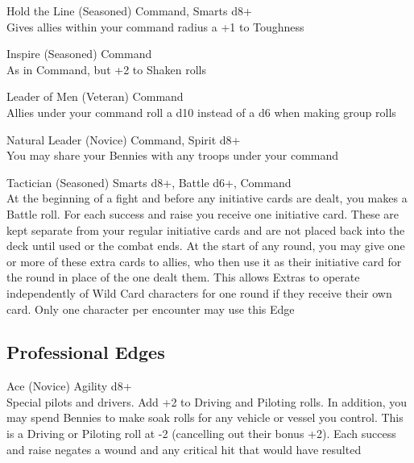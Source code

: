 \begin{multicols}{2}
\begin{genericsection}{Hold the Line (Seasoned)}
Command, Smarts d8+\\
Gives allies within your command radius a +1 to Toughness
\end{genericsection}

\begin{genericsection}{Inspire (Seasoned)}
Command\\
As in Command, but +2 to Shaken rolls
\end{genericsection}

\begin{genericsection}{Leader of Men (Veteran)}
Command\\
Allies under your command roll a d10 instead of a d6 when making group rolls
\end{genericsection}

\begin{genericsection}{Natural Leader (Novice)}
Command, Spirit d8+\\
You may share your Bennies with any troops under your command
\end{genericsection}

\begin{genericsection}{Tactician (Seasoned)}
Smarts d8+, Battle d6+, Command\\
At the beginning of a fight and before any initiative cards are dealt, you makes a Battle roll. For each success and raise you receive one initiative card. These are kept separate from your regular initiative cards and are not placed back into the deck until used or the combat ends. At the start of any round, you may give one or more of these extra cards to allies, who then use it as their initiative card for the round in place of the one dealt them. This allows Extras to operate independently of Wild Card characters for one round if they receive their own card. Only one character per encounter may use this Edge
\end{genericsection}


%
%
\subsection{Professional Edges}

\begin{genericsection}{Ace (Novice)}
Agility d8+\\
Special pilots and drivers. Add +2 to Driving and Piloting rolls. In addition, you may spend Bennies to make soak rolls for any vehicle or vessel you control. This is a Driving or Piloting roll at -2 (cancelling out their bonus +2). Each success and raise negates a wound and any critical hit that would have resulted
\end{genericsection}


\end{multicols}
